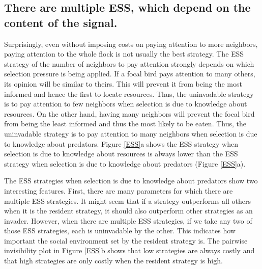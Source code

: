 \documentclass{article}
\begin{document}
\subsection{There are multiple ESS, which depend on the content of the signal. }
Surprisingly, even without imposing costs on paying attention to more neighbors, paying attention to the whole flock is not usually the best strategy. The ESS strategy of the number of neighbors to pay attention strongly depends on which selection pressure is being applied.  If a focal bird pays attention to many others, its opinion will be similar to theirs. This will prevent it from being the most informed and hence the first to locate resources. Thus, the uninvadable strategy is to pay attention to few neighbors when selection is due to knowledge about resources. On the other hand, having many neighbors will prevent the focal bird from being the least informed and thus the most likely to be eaten.  Thus, the uninvadable strategy is to pay attention to many neighbors when selection is due to knowledge about predators. Figure \ref{ESS}a shows the ESS strategy when selection is due to knowledge about resources is always lower than the ESS strategy when selection is due to knowledge about predators (Figure \ref{ESS}a).

The ESS strategies when selection is due to knowledge about predators show two interesting features. First, there are many parameters for which there are multiple ESS strategies. It might seem that if a strategy outperforms all others when it is the resident strategy, it should also outperform other strategies as an invader. However, when there are multiple ESS strategies, if we take any two of those ESS strategies, each is uninvadable by the other. This indicates how important the social environment set by the resident strategy is. The pairwise invisibility plot in Figure \ref{ESS}b shows that low strategies are always costly and that high strategies are only costly when the resident strategy is high. 
\end{document}
